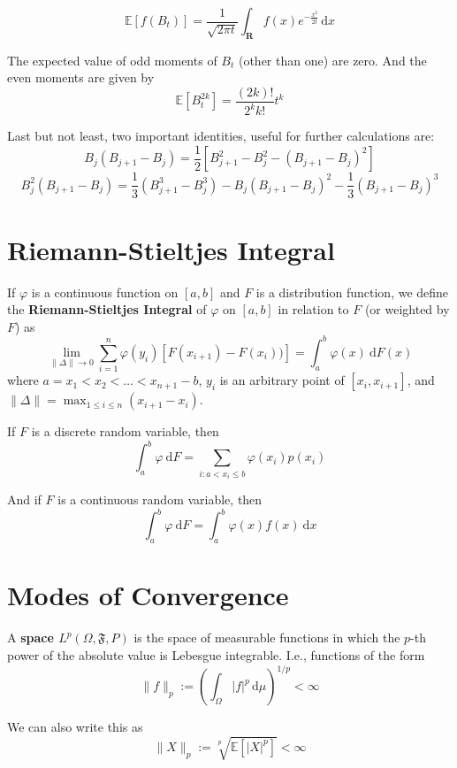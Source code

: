\begin{theorem}
	\[
		\mathbb{E}[f(B_t)] = \frac{1}{\sqrt{2 \pi t}} \int_{\textbf{R}} f(x) e^{-\frac{x^2}{2t}} \, \mathrm{d}x
	\]
\end{theorem}

\begin{theorem}
	The expected value of odd moments of $B_t$ (other than one) are zero. And the even moments are given by
	\[
		\mathbb{E}[B_t^{2k}] = \frac{(2k)!}{2^k k!} t^k
	\]
\end{theorem}

Last but not least, two important identities, useful for further calculations are:
\[
	B_j (B_{j+1} - B_j) = \frac{1}{2} [B_{j+1}^2 - B_j^2 - (B_{j+1} - B_j)^2]
\]
\[
	B_j^2 (B_{j+1} - B_j) = \frac{1}{3} (B_{j+1}^3 - B_j^3) - B_j(B_{j+1} - B_j)^2 - \frac{1}{3}(B_{j+1} - B_j)^3
\]

\section{Riemann-Stieltjes Integral}

\begin{definition}
	If $\varphi$ is a continuous function on $[a,b]$ and $F$ is a distribution function, we define the \textbf{Riemann-Stieltjes Integral} of $\varphi$ on $[a,b]$ in relation to $F$ (or weighted by $F$) as
	\[
		\lim_{\| \Delta \| \to 0} \sum_{i=1}^n \varphi(y_i)[F(x_{i+1}) - F(x_i))] = \int_a^b \varphi(x) ~\mathrm{d}F(x)
	\]
	where $a = x_1 < x_2 < \ldots < x_{n+1} - b$, $y_i$ is an arbitrary point of $[x_i, x_{i+1}]$, and $\| \Delta \| = \max_{1 \leq i \leq n} (x_{i+1} - x_i)$.
\end{definition}

If $F$ is a discrete random variable, then
\[
	\int_a^b \varphi ~\mathrm{d}F = \sum_{i: a < x_i \leq b} \varphi(x_i) p(x_i)
\]

And if $F$ is a continuous random variable, then
\[
	\int_a^b \varphi ~\mathrm{d}F = \int_a^b \varphi(x) f(x) ~\mathrm{d}x
\]

\section{Modes of Convergence}

\begin{definition}
	A \textbf{space $L^p (\Omega, \mathfrak{F}, P)$} is the space of measurable functions in which the $p$-th power of the absolute value is Lebesgue integrable. I.e., functions of the form
	\[
		\| f \|_p := \left( \int_\Omega |f|^p \, \mathrm{d}\mu \right)^{1/p} < \infty
	\]

	We can also write this as
	\[
		\| X \|_p := \sqrt[p]{\mathbb{E}[|X|^p]} < \infty
	\]
\end{definition}

